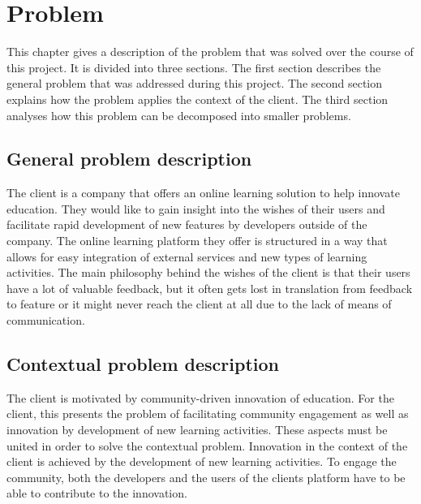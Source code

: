\chapter{Problem}

This chapter gives a description of the problem that was solved over the course of this project. It is divided into three sections. The first section describes the general problem that was addressed during this project. The second section explains how the problem applies the context of the client. The third section analyses how this problem can be decomposed into smaller problems.


\section{General problem description}

The client is a company that offers an online learning solution to help innovate education. They would like to gain insight into the wishes of their users and facilitate rapid development of new features by developers outside of the company. The online learning platform they offer is structured in a way that allows for easy integration of external services and new types of learning activities. The main philosophy behind the wishes of the client is that their users have a lot of valuable feedback, but it often gets lost in translation from feedback to feature or it might never reach the client at all due to the lack of means of communication.

\section{Contextual problem description}
The client is motivated by community-driven innovation of education. For the client, this presents the problem of facilitating community engagement as well as innovation by development of new learning activities. These aspects must be united in order to solve the contextual problem. Innovation in the context of the client is achieved by the development of new learning activities. To engage the community, both the developers and the users of the clients platform have to be able to contribute to the innovation.


